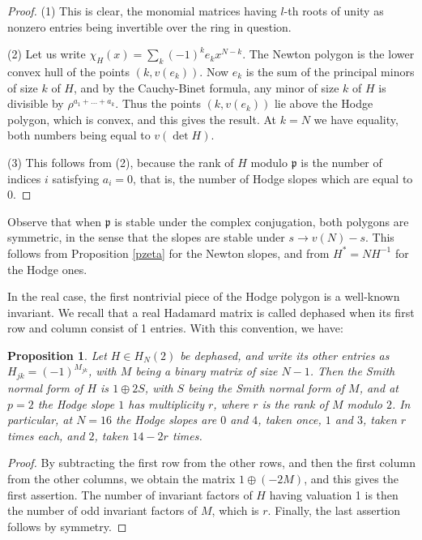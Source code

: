 \documentclass[11pt]{amsart}
\newtheorem{proposition}[theorem]{Proposition}
\theoremstyle{definition}
\begin{document}
\begin{proof}
(1) This is clear, the monomial matrices having $l$-th roots of unity as nonzero entries being invertible over the ring in question.

\medskip

(2) Let us write $\chi_H(x)=\sum_k(-1)^ke_kx^{N-k}$. The Newton polygon is the lower convex hull of the points $(k,v(e_k))$. Now $e_k$ is the sum of the principal minors of size $k$ of $H$, and by the Cauchy-Binet formula, any minor of size $k$ of $H$ is divisible by $\rho^{a_1+\ldots+a_k}$. Thus the points $(k,v(e_k))$ lie above the Hodge polygon, which is convex, and this gives the result. At $k=N$ we have equality, both numbers being equal to $v(\det H)$.

\medskip

(3) This follows from (2), because the rank of $H$ modulo $\mathfrak p$ is the number of indices $i$ satisfying $a_i=0$, that is, the number of Hodge slopes which are equal to 0.
\end{proof}

Observe that when $\mathfrak p$ is stable under the complex conjugation, both polygons are symmetric, in the sense that the slopes are stable under $s\to v(N)-s$. This follows from Proposition \ref{pzeta} for the Newton slopes, and from $H^*=NH^{-1}$ for the Hodge ones.

\medskip

In the real case, the first nontrivial piece of the Hodge polygon is a well-known invariant. We recall that a real Hadamard matrix is called dephased when its first row and column consist of 1 entries. With this convention, we have:

\begin{proposition}\label{pcore}
Let $H\in H_N(2)$ be dephased, and write its other entries as $H_{jk}=(-1)^{M_{jk}}$, with $M$ being a binary matrix of size $N-1$. Then the Smith normal form of $H$ is $1\oplus2S$, with $S$ being the Smith normal form of $M$, and at $p=2$ the Hodge slope $1$ has multiplicity $r$, where $r$ is the rank of $M$ modulo $2$. In particular, at $N=16$ the Hodge slopes are $0$ and $4$, taken once, $1$ and $3$, taken $r$ times each, and $2$, taken $14-2r$ times.
\end{proposition}

\begin{proof}
By subtracting the first row from the other rows, and then the first column from the other columns, we obtain the matrix $1\oplus(-2M)$, and this gives the first assertion. The number of invariant factors of $H$ having valuation 1 is then the number of odd invariant factors of $M$, which is $r$. Finally, the last assertion follows by symmetry.
\end{proof}
\end{document}
